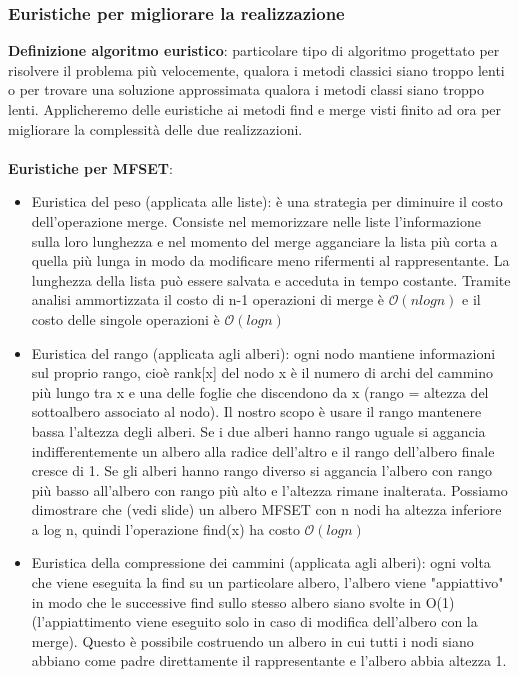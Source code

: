 \documentclass[../cheatSheetAlgoritmi.tex]{subfiles}
\begin{document}
\subsubsection{Euristiche per migliorare la realizzazione}
\textbf{Definizione algoritmo euristico}: particolare tipo di algoritmo progettato per risolvere il problema più velocemente, qualora i metodi classici siano troppo lenti o per trovare una soluzione approssimata qualora i metodi classi siano troppo lenti. Applicheremo delle euristiche ai metodi find e merge visti finito ad ora per migliorare la complessità delle due realizzazioni. \\\\
\textbf{Euristiche per MFSET}:
\begin{itemize}
	\item Euristica del peso (applicata alle liste): è una strategia per diminuire il costo dell'operazione merge. Consiste nel memorizzare nelle liste l'informazione sulla loro lunghezza e nel momento del merge agganciare la lista più corta a quella più lunga in modo da modificare meno rifermenti al rappresentante. La lunghezza della lista può essere salvata e acceduta in tempo costante. Tramite analisi ammortizzata il costo di n-1 operazioni di merge è $\mathcal{O}(n log n)$ e il costo delle singole operazioni è $\mathcal{O}(log n)$
	\item Euristica del rango (applicata agli alberi): ogni nodo mantiene informazioni sul proprio rango, cioè rank[x] del nodo x è il numero di archi del cammino più lungo tra x e una delle foglie che discendono da x (rango = altezza del sottoalbero associato al nodo). Il nostro scopo è usare il rango mantenere bassa l'altezza degli alberi. Se i due alberi hanno rango uguale si aggancia indifferentemente un albero alla radice dell'altro e il rango dell'albero finale cresce di 1. Se gli alberi hanno rango diverso si aggancia l'albero con rango più basso all'albero con rango più alto e l'altezza rimane inalterata. Possiamo dimostrare che (vedi slide) un albero MFSET con n nodi ha altezza inferiore a log n, quindi l'operazione find(x) ha costo   $\mathcal{O}(log n)$
	\item Euristica della compressione dei cammini (applicata agli alberi): ogni volta che viene eseguita la find su un particolare albero, l'albero viene "appiattivo" in modo che le successive find sullo stesso albero siano svolte in O(1) (l'appiattimento viene eseguito solo in caso di modifica dell'albero con la merge). Questo è possibile costruendo un albero in cui tutti i nodi siano abbiano come padre direttamente il rappresentante e l'albero abbia altezza 1.  
\end{itemize}
\end{document}

